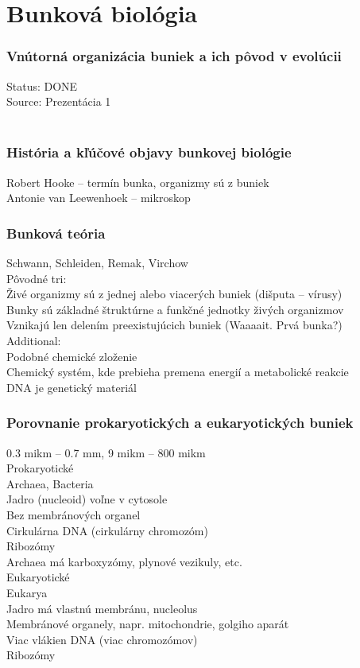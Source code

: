 \chapter[Bunková biológia]{Bunková biológia}
\label{bunkova_biologia} %

\subsection*{Vnútorná organizácia buniek a ich pôvod v evolúcii}
Status: DONE\\
Source: Prezentácia 1\\
\\
\subsection*{História a kľúčové objavy bunkovej biológie}
Robert Hooke -- termín bunka, organizmy sú z buniek\\
Antonie van Leewenhoek -- mikroskop\\
\subsection*{Bunková teória}
Schwann, Schleiden, Remak, Virchow\\
Pôvodné tri:\\
\tab Živé organizmy sú z jednej alebo viacerých buniek (dišputa -- vírusy)\\
\tab Bunky sú základné štruktúrne a funkčné jednotky živých organizmov\\
\tab Vznikajú len delením preexistujúcich buniek (Waaaait. Prvá bunka?)\\
Additional: \\
\tab Podobné chemické zloženie\\
\tab Chemický systém, kde prebieha premena energií a metabolické reakcie\\
\tab DNA je genetický materiál\\
\subsection*{Porovnanie prokaryotických a eukaryotických buniek}
0.3 mikm -- 0.7 mm, 9 mikm -- 800 mikm\\
Prokaryotické\\
\tab Archaea, Bacteria\\
\tab Jadro (nucleoid) voľne v cytosole\\
\tab Bez membránových organel\\
\tab Cirkulárna DNA (cirkulárny chromozóm)\\
\tab Ribozómy\\
\tab Archaea má karboxyzómy, plynové vezikuly, etc.\\
Eukaryotické\\
\tab Eukarya\\
\tab Jadro má vlastnú membránu, nucleolus\\
\tab Membránové organely, napr. mitochondrie, golgiho aparát\\
\tab Viac vlákien DNA (viac chromozómov)\\
\tab Ribozómy\\
